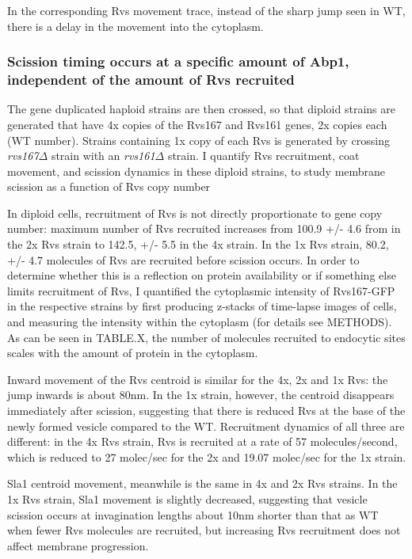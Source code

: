 		In the corresponding Rvs movement trace, instead of the sharp jump seen in WT, there is a delay in the movement into the cytoplasm.



			\subsubsection{Scission timing occurs at a specific amount of Abp1, \\
			independent of the amount of Rvs recruited}
			The gene duplicated haploid strains are then crossed, so that diploid strains are generated that have 4x copies of the Rvs167 and Rvs161 genes, 2x copies each (WT number). Strains containing 1x copy of each Rvs is generated by crossing \textit{rvs167$\Delta$} strain with an \textit{rvs161$\Delta$} strain. I quantify Rvs recruitment, coat movement, and scission dynamics in these diploid strains, to study membrane scission as a function of Rvs copy number
		

	
			\vspace{5mm}
			In diploid cells, recruitment of Rvs is not directly proportionate to gene copy number: maximum number of Rvs recruited increases from 100.9 +/- 4.6 from in the 2x Rvs strain to 142.5, +/- 5.5 in the 4x strain. In the 1x Rvs strain, 80.2, +/- 4.7 molecules of Rvs are recruited before scission occurs. In order to determine whether this is a reflection on protein availability or if something else limits recruitment of Rvs, I quantified the cytoplasmic intensity of Rvs167-GFP in the respective strains by first producing z-stacks of time-lapse images of cells, and measuring the intensity within the cytoplasm (for details see METHODS). 	As can be seen in TABLE.X, the number of molecules recruited to endocytic sites scales with the amount of protein in the cytoplasm.  
			
			\vspace{5mm}
			Inward movement of the Rvs centroid is similar for the 4x, 2x and 1x Rvs: the jump inwards is about 80nm. In the 1x strain, however, the centroid disappears immediately after scission, suggesting that there is reduced Rvs at the base of the newly formed vesicle compared to the WT. Recruitment dynamics of all three are different: in the 4x Rvs strain, Rvs is recruited at a rate of 57 molecules/second, which is reduced to 27 molec/sec for the 2x and 19.07 molec/sec for the 1x strain. 
			
			\vspace{5mm}
			Sla1 centroid movement, meanwhile is the same in 4x and 2x Rvs strains. In the 1x Rvs strain, Sla1 movement is slightly decreased, suggesting that vesicle scission occurs at invagination lengths about 10nm shorter than that as WT when fewer Rvs molecules are recruited, but increasing Rvs recruitment does not affect membrane progression. 
			
